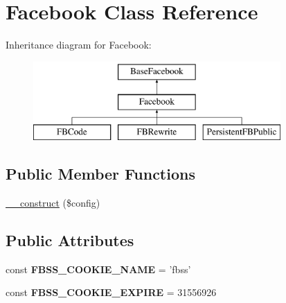 \hypertarget{classFacebook}{\section{Facebook Class Reference}
\label{classFacebook}
}
Inheritance diagram for Facebook\-:\begin{figure}[H]
\begin{center}
\leavevmode
\includegraphics[height=3.000000cm]{classFacebook}
\end{center}
\end{figure}
\subsection*{Public Member Functions}
\begin{DoxyCompactItemize}
\item 
\hyperlink{classFacebook_a764229508830d143551d167e786c42f4}{\-\_\-\-\_\-construct} (\$config)
\end{DoxyCompactItemize}
\subsection*{Public Attributes}
\begin{DoxyCompactItemize}
\item 
\hypertarget{classFacebook_ae225a7e23884e520cf9939025c35caec}{const {\bfseries F\-B\-S\-S\-\_\-\-C\-O\-O\-K\-I\-E\-\_\-\-N\-A\-M\-E} = 'fbss'}\label{classFacebook_ae225a7e23884e520cf9939025c35caec}

\item 
\hypertarget{classFacebook_a42b34f4010aeda2c7ec1198952b17ba1}{const {\bfseries F\-B\-S\-S\-\_\-\-C\-O\-O\-K\-I\-E\-\_\-\-E\-X\-P\-I\-R\-E} = 31556926}\label{classFacebook_a42b34f4010aeda2c7ec1198952b17ba1}

\end{DoxyCompactItemize}
